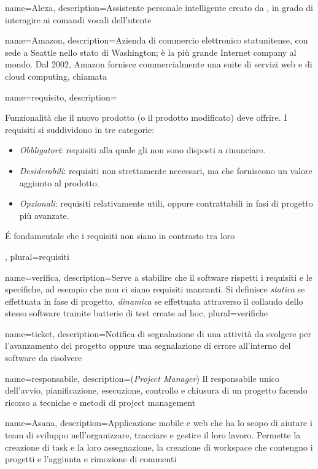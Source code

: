 
{
  name=Alexa,
  description={Assistente personale intelligente creato da , in grado di interagire ai comandi vocali dell'utente}
}

{
	name=Amazon,
	description={Azienda di commercio elettronico statunitense, con sede a Seattle nello stato di Washington; è la più grande Internet company al mondo. Dal 2002, Amazon fornisce commercialmente una suite di servizi web e di cloud computing, chiamata } 
}

{
  name=requisito,
  description={Funzionalità che il nuovo prodotto (o il prodotto modificato) deve offrire. I requisiti si suddividono in tre categorie:
  \begin{itemize}
  \item \emph{Obbligatori}: requisiti alla quale gli  non sono disposti a rinunciare.
  \item \emph{Desiderabili}: requisiti non strettamente necessari, ma che forniscono un valore aggiunto al prodotto.
  \item \emph{Opzionali}: requisiti relativamente utili, oppure contrattabili in fasi di progetto più avanzate.
  \end{itemize}
  \'E fondamentale che i requisiti non siano in contrasto tra loro},
  plural=requisiti
}

{
  name=verifica,
  description={Serve a stabilire che il software rispetti i requisiti e le specifiche, ad esempio che non ci siano requisiti mancanti. Si definisce \emph{statica} se effettuata in fase di progetto, \emph{dinamica} se effettuata attraverso il collaudo dello stesso software tramite batterie di test create ad hoc},
  plural=verifiche
}

{
  name=ticket,
  description={Notifica di segnalazione di una attività da svolgere per l’avanzamento del progetto oppure una segnalazione di errore all’interno del software da risolvere}
}

{
  name=responsabile,
  description={(\emph{Project Manager}) Il responsabile unico dell'avvio, pianificazione, esecuzione, controllo e chiusura di un progetto facendo ricorso a tecniche e metodi di project management}
}

{
  name=Asana,
  description={Applicazione mobile e web che ha lo scopo di aiutare i team di sviluppo nell'organizzare, tracciare e gestire il loro lavoro. Permette la creazione di task e la loro assegnazione, la creazione di workspace che contengno i progetti e l’aggiunta e rimozione di commenti}
}

